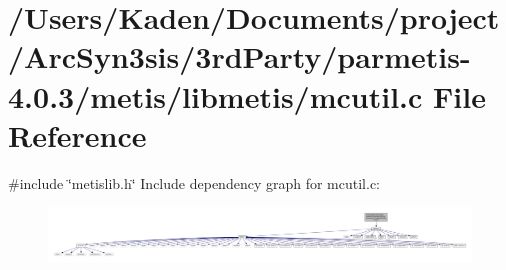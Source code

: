 \hypertarget{a00230}{}\section{/\+Users/\+Kaden/\+Documents/project/\+Arc\+Syn3sis/3rd\+Party/parmetis-\/4.0.3/metis/libmetis/mcutil.c File Reference}
\label{a00230}
{\ttfamily \#include \char`\"{}metislib.\+h\char`\"{}}\newline
Include dependency graph for mcutil.\+c\+:\nopagebreak
\begin{figure}[H]
\begin{center}
\leavevmode
\includegraphics[width=350pt]{a00231}
\end{center}
\end{figure}
